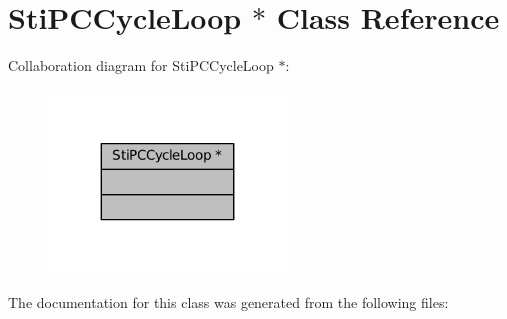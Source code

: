 \hypertarget{classStiPCCycleLoop_01_5}{}\section{Sti\+P\+C\+Cycle\+Loop $\ast$ Class Reference}
\label{classStiPCCycleLoop_01_5}


Collaboration diagram for Sti\+P\+C\+Cycle\+Loop $\ast$\+:
\nopagebreak
\begin{figure}[H]
\begin{center}
\leavevmode
\includegraphics[width=179pt]{classStiPCCycleLoop_01_5__coll__graph}
\end{center}
\end{figure}


The documentation for this class was generated from the following files\+:
